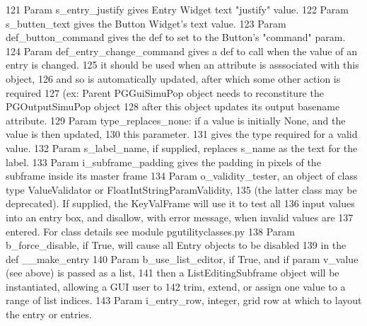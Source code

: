 \begin{DoxyCode}
121 \textcolor{stringliteral}{        Param s\_entry\_justify gives Entry Widget text "justify" value.}
122 \textcolor{stringliteral}{        Param s\_butten\_text gives the Button Widget's text value.}
123 \textcolor{stringliteral}{        Param def\_button\_command gives the def to set to the Button's "command" param.}
124 \textcolor{stringliteral}{        Param def\_entry\_change\_command gives a def to call when the value of an entry is changed.           
        }
125 \textcolor{stringliteral}{              it should be used when an attribute is asssociated with this object,}
126 \textcolor{stringliteral}{              and so is automatically updated, after which some other action is required }
127 \textcolor{stringliteral}{              (ex: Parent PGGuiSimuPop object needs to reconstiture the PGOutputSimuPop object }
128 \textcolor{stringliteral}{              after this object updates its output basename attribute.}
129 \textcolor{stringliteral}{        Param type\_replaces\_none: if a value is initially None, and the value is then updated, }
130 \textcolor{stringliteral}{              this parameter.}
131 \textcolor{stringliteral}{              gives the type required for a valid value.}
132 \textcolor{stringliteral}{        Param s\_label\_name, if supplied, replaces s\_name as the text for the label.}
133 \textcolor{stringliteral}{        Param i\_subframe\_padding gives the padding in pixels of the subframe inside its master frame}
134 \textcolor{stringliteral}{        Param o\_validity\_tester, an object of class type ValueValidator or FloatIntStringParamValidity,}
135 \textcolor{stringliteral}{              (the latter class may be deprecated). If supplied, the KeyValFrame will use it to test all}
136 \textcolor{stringliteral}{              input values into an entry box, and disallow, with error message, when invalid values are}
137 \textcolor{stringliteral}{              entered. For class details see module pgutilityclasses.py}
138 \textcolor{stringliteral}{        Param b\_force\_disable, if True, will cause all Entry objects to be disabled }
139 \textcolor{stringliteral}{              in the def \_\_make\_entry}
140 \textcolor{stringliteral}{        Param b\_use\_list\_editor, if True, and if param v\_value (see above) is passed as a list, }
141 \textcolor{stringliteral}{              then a ListEditingSubframe object will be instantiated, allowing a GUI user to}
142 \textcolor{stringliteral}{              trim, extend, or assign one value to a range of list indices.}
143 \textcolor{stringliteral}{        Param i\_entry\_row, integer, grid row at which to layout the entry or entries.}

\end{DoxyCode}
